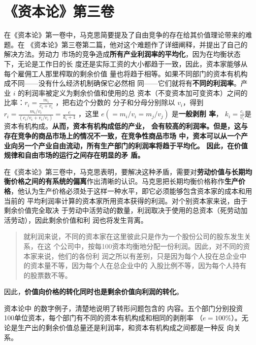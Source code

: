 \section{《资本论》第三卷}

在《资本论》第一卷中，马克思简要提及了自由竞争的存在给其价值理论带来的难题。在
《资本论》第三卷第二篇，他对这个难题作了详细阐释，并提出了自己的解决方法。劳动力
市场的竞争造成\textbf{所有产业利润率的平均化}，因为在均衡状态下，无论是工作日的长
度还是实际工资的大小都趋于一致，因此，资本家能够从每个雇佣工人那里榨取的剩余价值
量也将趋于相等。如果不同部门的资本有机构成不同——没有什么经济机制确保它必然相
同——它们就将有\textbf{不同的利润率}。产业 $i$ 的利润率被定义为剩余价值和使用的总
资本（不变资本加可变资本）之间的比率：$r_i=\frac{m_i}{c_i+v_i}$ ，把右边个分数的
分子和分母分别除以 $v_i$，得到 $r_i=\frac{m_i/v_i}{(c_i/v_i +
  v_i/v_i)}=\frac{e}{k_i+1}$ ，这里 $e(=m_i/v_i = m_j/v_j)$ 是\textbf{一般剥削
  率}， $k_i=\frac{c_i}{v_i}$是资本有机构成。\textbf{从而，资本有机构成低的产业，
  会有较高的利润率。但是，这与存在竞争的商品市场上的情况不一致，在竞争性商品市场
  中，资本可以从一个产业向另一个产业自由流动，所有生产部门的利润率将趋于平均化。
  因此，在价值规律和自由市场的运行之间存在明显的矛
  盾。}


在《资本论》第三卷中，马克思表明，要解决这种矛盾，需要对\textbf{劳动价值与长期均
  衡价格之间的有系统的偏离}作出清晰的认识。马克思把长期均衡价格称作\textbf{生产价
  格}，他认为生产价格必须处于这样一种水平，即它必须能够包含资本家的成本和用当前的
平均利润率计算的资本家所用资本获得的利润。对个别资本家来说，由于剩余价值完全取决
于劳动中活劳动的数量，利润取决于使用的总资本（死劳动加活劳动），因此剩余价值和利
润也将发生背离。

\begin{quotation}
  就利润来说，不同的资本家在这里彼此只是作为一个股份公司的股东发生关系，在这
  个公司中，按每100资本均衡地分配一份利润。因此，对不同的资本家来说，他们的各份利
  润之所以有差别，只是因为每个人投在总企业中的资本量不等，因为每个人在总企业中的
  入股比例不等，因为每个人持有的股票数不等。 
\end{quotation}
 因此，\textbf{价值向价格的转化同时也是剩余价值向利润的转化}。

 资本论中 的数字例子，清楚地说明了转形问题包含的
 内容。五个部门分别投资100单位资本，每个部门有不同的资本有机构成和相同的剥削率
 （$e=100\%$）。无论是生产出的剩余价值总量还是利润率，和资本有机构成之间都是一种反
 向关系。

